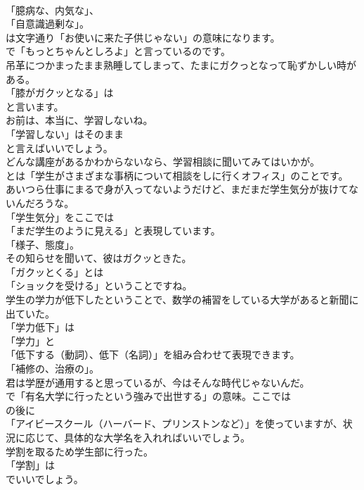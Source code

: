 \documentclass[8pt]{extreport}
\begin{document}
\begin{CJK}{UTF8}{min}
\\	「臆病な、内気な」、
\\	「自意識過剰な」。	
\\	は文字通り「お使いに来た子供じゃない」の意味になります。
\\	で「もっとちゃんとしろよ」と言っているのです。	
\\	吊革につかまったまま熟睡してしまって、たまにガクっとなって恥ずかしい時がある。 
\\	「膝がガクッとなる」は
\\	と言います。	
\\	お前は、本当に、学習しないね。 
\\	「学習しない」はそのまま
\\	と言えばいいでしょう。	
\\	どんな講座があるかわからないなら、学習相談に聞いてみてはいかが。 
\\	とは「学生がさまざまな事柄について相談をしに行くオフィス」のことです。	
\\	あいつら仕事にまるで身が入ってないようだけど、まだまだ学生気分が抜けてないんだろうな。 
\\	「学生気分」をここでは
\\	「まだ学生のように見える」と表現しています。
\\	「様子、態度」。	
\\	その知らせを聞いて、彼はガクッときた。 
\\	「ガクッとくる」とは
\\	「ショックを受ける」ということですね。	
\\	学生の学力が低下したということで、数学の補習をしている大学があると新聞に出ていた。 
\\	「学力低下」は
\\	「学力」と
\\	「低下する（動詞）、低下（名詞）」を組み合わせて表現できます。
\\	「補修の、治療の」。	
\\	君は学歴が通用すると思っているが、今はそんな時代じゃないんだ。 
\\	で「有名大学に行ったという強みで出世する」の意味。ここでは
\\	の後に
\\	「アイビースクール（ハーバード、プリンストンなど）」を使っていますが、状況に応じて、具体的な大学名を入れればいいでしょう。	
\\	学割を取るため学生部に行った。 
\\	「学割」は 
\\	でいいでしょう。

\end{CJK}
\end{document}
